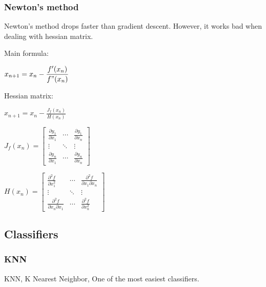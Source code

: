 \documentclass{article} %
\begin{document}
\subsubsection{Newton's method}
Newton's method drops faster than gradient descent. However, it works bad when dealing with hessian matrix. 

Main formula:
\begin{center}
${\displaystyle x_{n+1}=x_n-\frac{f'(x_n)}{f"(x_n)}}$
\end{center}

Hessian matrix:
\begin{center}
${\displaystyle x_{n+1}=x_n-\frac{J_f(x_n)}{H(x_n)}}$

${\displaystyle J_f(x_n)=
\begin{bmatrix}
\frac{\partial y_1}{\partial x_1}      & \cdots & \frac{\partial y_1}{\partial x_n}      \\
\vdots & \ddots & \vdots \\
\frac{\partial y_n}{\partial x_1}      & \cdots & \frac{\partial y_n}{\partial x_n}
\end{bmatrix}
}$

${\displaystyle H(x_n)=
\begin{bmatrix}
\frac{\partial^2 f}{\partial x_1^2}   & \cdots & \frac{\partial^2 f}{\partial x_1 \partial x_n}      \\
\vdots & \ddots & \vdots \\
\frac{\partial^2 f}{\partial x_n \partial x_1}   & \cdots & \frac{\partial^2 f}{\partial x_n^2}
\end{bmatrix}
}$
\end{center}

\subsection{Classifiers}

\subsubsection{KNN}
KNN, K Nearest Neighbor, One of the most easiest classifiers.
\end{document}
